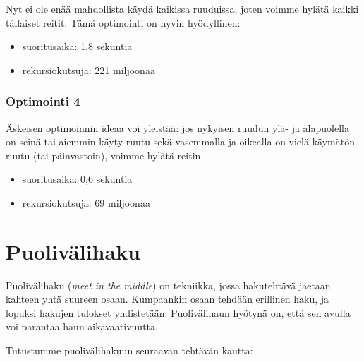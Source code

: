 \begin{center}
\end{center}

Nyt ei ole enää mahdollista käydä kaikissa ruuduissa,
joten voimme hylätä kaikki tällaiset reitit.
Tämä optimointi on hyvin hyödyllinen:

\begin{itemize}
\item
suoritusaika: 1{,}8 sekuntia
\item
rekursiokutsuja: 221 miljoonaa
\end{itemize}

\subsubsection{Optimointi 4}

Äskeisen optimoinnin ideaa voi yleistää:
jos nykyisen ruudun ylä- ja alapuolella on
seinä tai aiemmin käyty ruutu
sekä vasemmalla ja oikealla on
vielä käymätön ruutu (tai päinvastoin),
voimme hylätä reitin.

\begin{itemize}
\item
suoritusaika: 0{,}6 sekuntia
\item
rekursiokutsuja: 69 miljoonaa
\end{itemize}

\section{Puolivälihaku}


Puolivälihaku (\textit{meet in the middle})
on tekniikka,
jossa hakutehtävä jaetaan kahteen yhtä suureen osaan.
Kumpaankin osaan tehdään erillinen haku,
ja lopuksi hakujen tulokset yhdistetään.
Puolivälihaun hyötynä on, että sen avulla voi
parantaa haun aikavaativuutta.

Tutustumme puolivälihakuun seuraavan tehtävän kautta:

